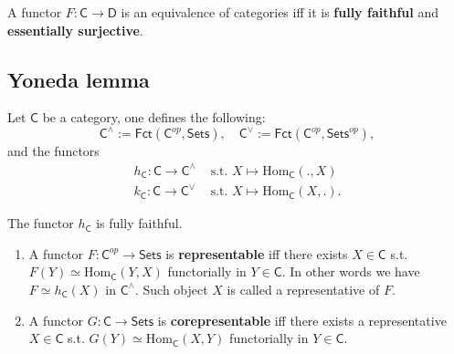 \begin{prop}
	A functor $F: \mathsf{C} \to \mathsf{D}$ is an equivalence of categories iff it is \textbf{fully faithful} and \textbf{essentially surjective}.
\end{prop} 

\subsection{Yoneda lemma}

\begin{defn}[]
	Let $\mathsf{C}$ be a category, one defines the following:
	\begin{equation}
	\mathsf{C}^\wedge := \mathsf{Fct}\left(\mathsf{C}^{op}, \mathsf{Sets} \right), \quad \mathsf{C}^\vee := \mathsf{Fct}\left(\mathsf{C}^{op}, \mathsf{Sets}^{op} \right)
	,\end{equation} 
	and the functors
	\begin{align}
		h_\mathsf{C}: \mathsf{C} \to \mathsf{C}^\wedge &\text{ s.t. } X \mapsto \mathrm{Hom}_{\mathsf{\mathsf{C}}} \left( ., X \right)\\
		k_\mathsf{C}: \mathsf{C} \to \mathsf{C}^\vee &\text{ s.t. } X \mapsto \mathrm{Hom}_{\mathsf{\mathsf{C}}} \left( X, . \right)
	.\end{align}
\end{defn}

\begin{lem}[Yoneda]
	The functor $h_\mathsf{C}$ is fully faithful.
\end{lem} 

\begin{defn}\leavevmode\vspace{-\baselineskip}
	\begin{enumerate}
		\item A functor $F: \mathsf{C}^{op} \to \mathsf{Sets}$ is \textbf{representable} iff there exists $X \in \mathsf{C}$ s.t. $F(Y) \simeq \mathrm{Hom}_{\mathsf{C}} \left( Y, X \right)$ functorially in $Y \in \mathsf{C}$.
			In other words we have $F \simeq h_\mathsf{C}(X)$ in $\mathsf{C}^{\wedge}$. 
			Such object $X$ is called a representative of $F$.
		\item A functor $G: \mathsf{C} \to \mathsf{Sets}$ is \textbf{corepresentable} iff there exists a representative $X \in \mathsf{C}$ s.t. $G(Y) \simeq \mathrm{Hom}_{\mathsf{C}} \left( X, Y \right)$ functorially in $Y \in \mathsf{C}$.
	\end{enumerate} 
\end{defn}

